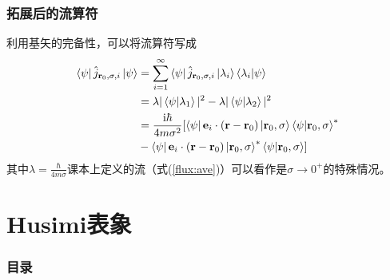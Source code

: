 \documentclass[UTF8]{beamer}
\begin{document}
\begin{frame}
	\frametitle{拓展后的流算符}
	利用基矢的完备性，可以将流算符写成
	\begin{align}
		\bra{\psi}\hat{j}_{\mathbf{r}_0,\sigma,i}\ket{\psi} & =\sum_{i=1}^\infty
		\bra{\psi}\hat{j}_{\mathbf{r}_0,\sigma,i}\ket{\lambda_i}\braket{\lambda_i|\psi}                                                                                                                                       \\
		                                                    & =\lambda | \braket{\psi|\lambda_1}|^2-\lambda|\braket{\psi|\lambda_2}|^2                                                                                        \\
		                                                    & =\frac{\mathrm{i}\hbar}{4m\sigma^2}[\bra{\psi}\mathbf{e}_i\cdot(\mathbf{r}-\mathbf{r}_0)\ket{\mathbf{r}_0,\sigma}\braket{\psi|\mathbf{r}_0,\sigma}^{*}\nonumber
		\\&-\bra{\psi}\mathbf{e}_i\cdot(\mathbf{r}-\mathbf{r}_0)\ket{\mathbf{r}_0,\sigma}^{*}\braket{\psi|\mathbf{r}_0,\sigma}]
	\end{align}
	其中$\lambda=\frac{\hbar}{4m\sigma}$课本上定义的流（式(\ref{flux:ave})）可以看作是$\sigma\rightarrow0^{+}$的特殊情况。
\end{frame}
%
\section{Husimi表象}
\begin{frame}\frametitle{目录}
	\tableofcontents[currentsection]
\end{frame}
\end{document}

